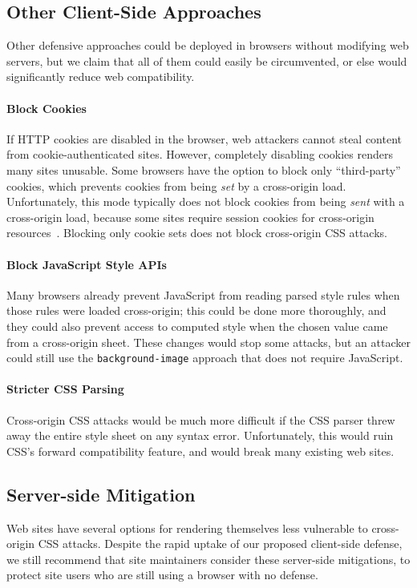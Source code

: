 \documentclass{acm_proc_article-sp}
\begin{document}
\subsection{Other Client-Side Approaches}
Other defensive approaches could be deployed in browsers without
modifying web servers, but we claim that all of them could easily be
circumvented, or else would significantly reduce web compatibility.

\paragraph{Block Cookies}
If HTTP cookies are disabled in the browser, web attackers cannot
steal content from cookie-au\-then\-ti\-cated sites.  However, completely
disabling cookies renders many sites unusable.  Some browsers have the
option to block only “third-party” cookies, which prevents cookies
from being \emph{set} by a cross-origin load.  Unfortunately, this
mode typically does not block cookies from being \emph{sent} with a
cross-origin load, because some sites require session cookies for
cross-origin resources~\cite{jackson06thirdpartycookies}.  Blocking
only cookie sets does not block cross-origin CSS attacks.

\paragraph{Block JavaScript Style APIs}
Many browsers already prevent JavaScript from reading parsed style
rules when those rules were loaded cross-origin; this could be done
more thoroughly, and they could also prevent access to computed style
when the chosen value came from a cross-origin sheet.  These changes
would stop some attacks, but an attacker could still use the
\texttt{background-image} approach that does not require JavaScript.

\paragraph{Stricter CSS Parsing}
Cross-origin CSS attacks would be much more difficult if the CSS
parser threw away the entire style sheet on any syntax error.
Unfortunately, this would ruin CSS's forward compatibility feature,
and would break many existing web sites.

\subsection{Server-side Mitigation}
Web sites have several options for rendering themselves less
vulnerable to cross-origin CSS attacks.  Despite the rapid uptake of
our proposed client-side defense, we still recommend that site
maintainers consider these server-side mitigations, to protect site
users who are still using a browser with no defense.
\end{document}
